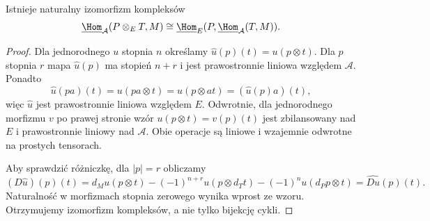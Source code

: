 \begin{lemat}\label{cat:lem:morita-tensor-hom}
Istnieje naturalny izomorfizm kompleksów
\[
 \underline{\Hom}_{\mathcal A}(P\otimes_E T,M)
 \cong
 \underline{\Hom}_{E}
       (P,\underline{\Hom}_{\mathcal A}(T,M)).
\]
\end{lemat}
\begin{proof}
Dla jednorodnego $u$ stopnia $n$ określamy $\widehat u(p)(t)=u(p\otimes t)$. Dla $p$ stopnia $r$ mapa $\widehat u(p)$ ma stopień $n+r$ i jest prawostronnie liniowa względem $\mathcal A$. Ponadto
\[
 \widehat u(pa)(t)=u(pa\otimes t)=u(p\otimes at)
 =(\widehat u(p)a)(t),
\]
więc $\widehat u$ jest prawostronnie liniowa względem $E$. Odwrotnie, dla jednorodnego morfizmu $v$ po prawej stronie wzór $u(p\otimes t)=v(p)(t)$ jest zbilansowany nad $E$ i prawostronnie liniowy nad $\mathcal A$. Obie operacje są liniowe i wzajemnie odwrotne na prostych tensorach.

Aby sprawdzić różniczkę, dla $|p|=r$ obliczamy
\[
 (D\widehat u)(p)(t)
 =d_Mu(p\otimes t)-(-1)^{n+r}u(p\otimes d_Tt)
                    -(-1)^nu(d_Pp\otimes t)
 =\widehat{Du}(p)(t).
\]
Naturalność w morfizmach stopnia zerowego wynika wprost ze wzoru. Otrzymujemy izomorfizm kompleksów, a nie tylko bijekcję cykli.
\end{proof}

